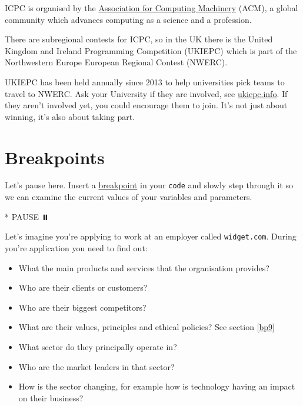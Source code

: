 \documentclass[
]{book}
\newenvironment{Shaded}{\begin{snugshade}}{\end{snugshade}}
\newcommand{\NormalTok}[1]{#1}
\newcommand{\SpecialStringTok}[1]{\textcolor[rgb]{0.31,0.60,0.02}{#1}}
\providecommand{\tightlist}{%
  \setlength{\itemsep}{0pt}\setlength{\parskip}{0pt}}
\begin{document}
ICPC is organised by the \href{https://en.wikipedia.org/wiki/Association_for_Computing_Machinery}{Association for Computing Machinery} (ACM), a global community which advances computing as a science and a profession.

There are subregional contests for ICPC, so in the UK there is the United Kingdom and Ireland Programming Competition (UKIEPC) which is part of the Northwestern Europe European Regional Contest (NWERC).

UKIEPC has been held annually since 2013 to help universities pick teams to travel to NWERC. Ask your University if they are involved, see \href{http://ukiepc.info}{ukiepc.info}. If they aren't involved yet, you could encourage them to join. It's not just about winning, it's also about taking part.

\hypertarget{bp10}{%
\section{Breakpoints}\label{bp10}}

Let's pause here. Insert a \href{https://en.wikipedia.org/wiki/Breakpoint}{breakpoint} in your \texttt{code} and slowly step through it so we can examine the current values of your variables and parameters.

\begin{Shaded}
\begin{Highlighting}[]
\SpecialStringTok{* }\NormalTok{PAUSE ⏸️}
\end{Highlighting}
\end{Shaded}

Let's imagine you're applying to work at an employer called \texttt{widget.com}. During you're application you need to find out:

\begin{itemize}
\tightlist
\item
  What the main products and services that the organisation provides?
\item
  Who are their clients or customers?
\item
  Who are their biggest competitors?
\item
  What are their values, principles and ethical policies? See section \ref{bp9}
\item
  What sector do they principally operate in?
\item
  Who are the market leaders in that sector?
\item
  How is the sector changing, for example how is technology having an impact on their business?
\end{itemize}
\end{document}
